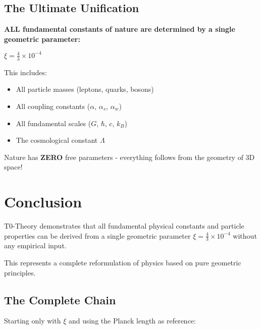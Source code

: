 \documentclass[12pt,a4paper]{article}
\newcommand{\xipar}{\xi}  %
\begin{document}
	\subsection{The Ultimate Unification}
	
	\begin{tcolorbox}[colback=red!5, colframe=red!75!black, title=Revolutionary Result]
		\textbf{ALL fundamental constants of nature are determined by a single geometric parameter:}
		
		$\xipar = \frac{4}{3} \times 10^{-4}$
		
		This includes:
		\begin{itemize}
			\item All particle masses (leptons, quarks, bosons)
			\item All coupling constants ($\alpha$, $\alpha_s$, $\alpha_w$)
			\item All fundamental scales ($G$, $\hbar$, $c$, $k_B$)
			\item The cosmological constant $\Lambda$
		\end{itemize}
		
		Nature has \textbf{ZERO} free parameters - everything follows from the geometry of 3D space!
	\end{tcolorbox}
	
	\section{Conclusion}
	
	\begin{tcolorbox}[colback=green!5, colframe=green!75!black, title=Central Result]
		T0-Theory demonstrates that all fundamental physical constants and particle properties can be derived from a single geometric parameter $\xipar = \frac{4}{3} \times 10^{-4}$ without any empirical input.
		
		This represents a complete reformulation of physics based on pure geometric principles.
	\end{tcolorbox}
	
	\subsection{The Complete Chain}
	
	Starting only with $\xipar$ and using the Planck length as reference:
	
\end{document}
